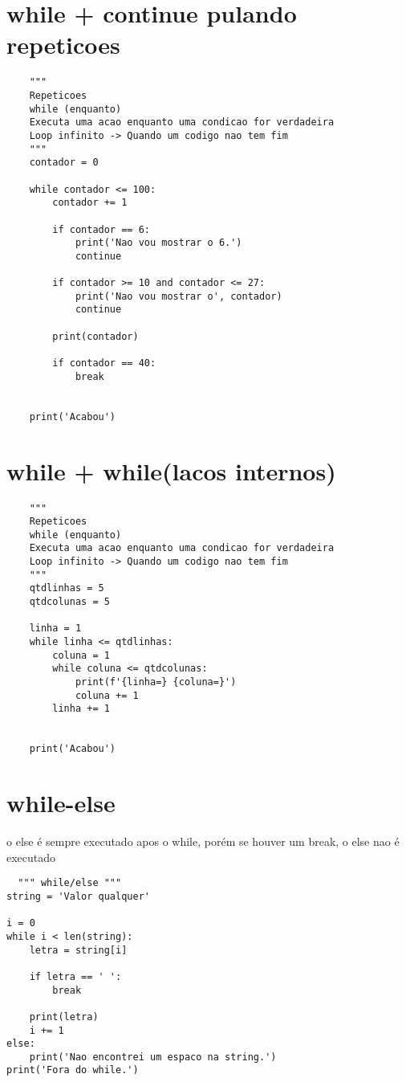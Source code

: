 \documentclass{article}
\begin{document}
\section{while + continue pulando repeticoes}
  \begin{lstlisting}
    """
    Repeticoes
    while (enquanto)
    Executa uma acao enquanto uma condicao for verdadeira
    Loop infinito -> Quando um codigo nao tem fim
    """
    contador = 0
    
    while contador <= 100:
        contador += 1
    
        if contador == 6:
            print('Nao vou mostrar o 6.')
            continue
    
        if contador >= 10 and contador <= 27:
            print('Nao vou mostrar o', contador)
            continue
    
        print(contador)
    
        if contador == 40:
            break
    
    
    print('Acabou')
  \end{lstlisting}
\section{while + while(lacos internos)} 
  \begin{lstlisting}
    """
    Repeticoes
    while (enquanto)
    Executa uma acao enquanto uma condicao for verdadeira
    Loop infinito -> Quando um codigo nao tem fim
    """
    qtdlinhas = 5
    qtdcolunas = 5
    
    linha = 1
    while linha <= qtdlinhas:
        coluna = 1
        while coluna <= qtdcolunas:
            print(f'{linha=} {coluna=}')
            coluna += 1
        linha += 1
    
    
    print('Acabou') 
  \end{lstlisting}
\section{while-else}
o else é sempre executado apos o while, porém se houver um break, o else nao é executado
\begin{lstlisting}
  """ while/else """
string = 'Valor qualquer'

i = 0
while i < len(string):
    letra = string[i]

    if letra == ' ':
        break

    print(letra)
    i += 1
else:
    print('Nao encontrei um espaco na string.')
print('Fora do while.')
\end{lstlisting}
\end{document}
